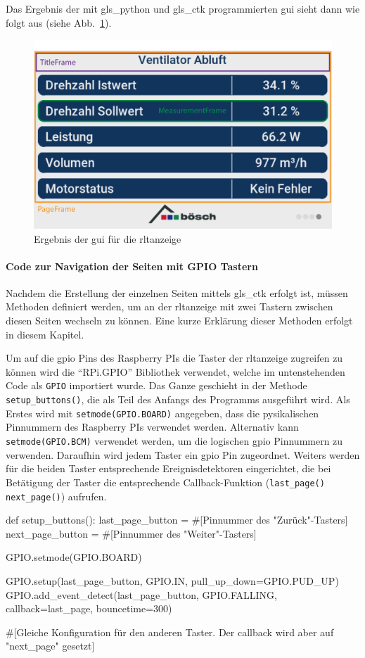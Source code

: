 Das Ergebnis der mit \gls{gls_python} und \gls{gls_ctk} programmierten \ac{gui} sieht dann wie folgt aus (siehe Abb.~\ref{fig:ctk_gui}).
\begin{figure}[H]
    \centering
    \includegraphics[width=0.75\linewidth]{Bilder/CTK_components.png}
    \caption{Ergebnis der \ac{gui} für die \ac{rltanzeige}}
    \label{fig:ctk_gui}
\end{figure}

\paragraph{Code zur Navigation der Seiten mit GPIO Tastern} \label{gpio_taster}

Nachdem die Erstellung der einzelnen Seiten mittels \gls{gls_ctk} erfolgt ist, müssen Methoden definiert werden, um an der \acs{rltanzeige} mit zwei Tastern zwischen diesen Seiten wechseln zu können. Eine kurze Erklärung dieser Methoden erfolgt in diesem Kapitel.

Um auf die \ac{gpio} Pins des Raspberry PIs \bzw die Taster der \acs{rltanzeige} zugreifen zu können wird die \enquote{RPi.GPIO} Bibliothek verwendet, welche im untenstehenden Code als \lstinline{GPIO} importiert wurde. Das Ganze geschieht in der Methode \lstinline{setup_buttons()}, die als Teil des Anfangs des Programms ausgeführt wird.
Als Erstes wird mit \lstinline{setmode(GPIO.BOARD)} angegeben, dass die pysikalischen Pinnummern des Raspberry PIs verwendet werden. Alternativ kann \lstinline{setmode(GPIO.BCM)} verwendet werden, um die logischen \ac{gpio} Pinnummern zu verwenden. Daraufhin wird jedem Taster ein \ac{gpio} Pin zugeordnet. Weiters werden für die beiden Taster entsprechende Ereignisdetektoren eingerichtet, die bei Betätigung der Taster die entsprechende Callback-Funktion (\lstinline{last_page()} \bzw \lstinline{next_page()}) aufrufen.

\begin{pythoncode}
def setup_buttons():
    last_page_button = #[Pinnummer des "Zurück"-Tasters]
    next_page_button = #[Pinnummer des "Weiter"-Tasters]

    GPIO.setmode(GPIO.BOARD)
    
    GPIO.setup(last_page_button, GPIO.IN, pull_up_down=GPIO.PUD_UP)
    GPIO.add_event_detect(last_page_button, GPIO.FALLING, callback=last_page, bouncetime=300)

    #[Gleiche Konfiguration für den anderen Taster. Der callback wird aber auf "next_page" gesetzt]
\end{pythoncode}

